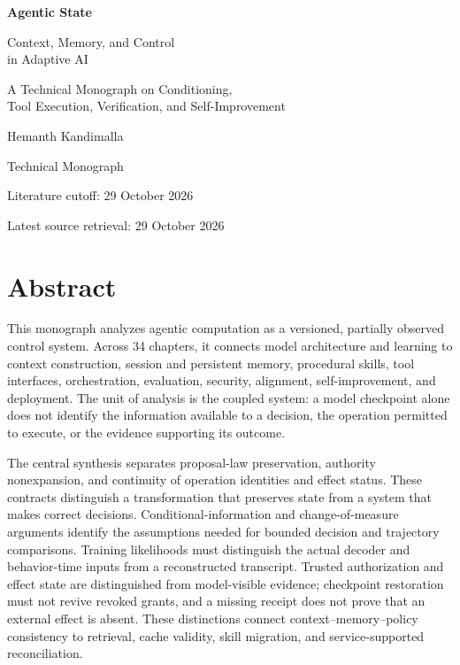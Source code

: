 \begin{titlepage}
\centering\vspace*{24mm}
{\Huge\bfseries Agentic State\par}
\vspace{5mm}
{\LARGE Context, Memory, and Control\\in Adaptive AI\par}
\vspace{10mm}
{\large A Technical Monograph on Conditioning,\\Tool Execution, Verification, and Self-Improvement\par}
\vspace{12mm}
{\Large Hemanth Kandimalla\par}
\vfill
{\large Technical Monograph\par}
\vspace{8mm}
{\normalsize Literature cutoff: 29 October 2026\par}
{\normalsize Latest source retrieval: 29 October 2026\par}
\end{titlepage}

\chapter*{Abstract}
This monograph analyzes agentic computation as a versioned, partially observed control system. Across 34 chapters, it connects model architecture and learning to context construction, session and persistent memory, procedural skills, tool interfaces, orchestration, evaluation, security, alignment, self-improvement, and deployment. The unit of analysis is the coupled system: a model checkpoint alone does not identify the information available to a decision, the operation permitted to execute, or the evidence supporting its outcome.

The central synthesis separates proposal-law preservation, authority nonexpansion, and continuity of operation identities and effect status. These contracts distinguish a transformation that preserves state from a system that makes correct decisions. Conditional-information and change-of-measure arguments identify the assumptions needed for bounded decision and trajectory comparisons. Training likelihoods must distinguish the actual decoder and behavior-time inputs from a reconstructed transcript. Trusted authorization and effect state are distinguished from model-visible evidence; checkpoint restoration must not revive revoked grants, and a missing receipt does not prove that an external effect is absent. These distinctions connect context--memory--policy consistency to retrieval, cache validity, skill migration, and service-supported reconciliation.

